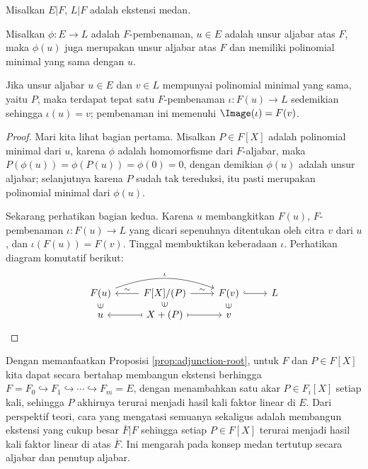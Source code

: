 \begin{proposition}\label{prop:field-embedding}
	Misalkan $E|F$, $L|F$ adalah ekstensi medan.
	\begin{compactenum}[(i)]
		\item Misalkan $\phi: E \to L$ adalah $F$-pembenaman, $u \in E$ adalah unsur aljabar atas $F$, maka $\phi(u)$ juga merupakan unsur aljabar atas $F$ dan memiliki polinomial minimal yang sama dengan $u$.
		\item Jika unsur aljabar $u \in E$ dan $v \in L$ mempunyai polinomial minimal yang sama, yaitu $P$, maka terdapat tepat satu $F$-pembenaman $\iota: F(u) \to L$ sedemikian sehingga $\iota(u)=v$; pembenaman ini memenuhi $\Image(\iota)=F(v)$.
	\end{compactenum}
\end{proposition}
\begin{proof}
	Mari kita lihat bagian pertama. Misalkan $P \in F[X]$ adalah polinomial minimal dari $u$, karena $\phi$ adalah homomorfisme dari $F$-aljabar, maka $P(\phi(u)) = \phi(P(u)) = \phi(0) =0$, dengan demikian $\phi(u)$ adalah unsur aljabar; selanjutnya karena $P$ sudah tak tereduksi, itu pasti merupakan polinomial minimal dari $\phi(u)$.

	Sekarang perhatikan bagian kedua. Karena $u$ membangkitkan $F(u)$, $F$-pembenaman $\iota: F(u) \to L$ yang dicari sepenuhnya ditentukan oleh citra $v$ dari $u$, dan $\iota(F(u))=F(v)$. Tinggal membuktikan keberadaan $\iota$. Perhatikan diagram komutatif berikut:
	\begin{equation*}\begin{tikzcd}[row sep=tiny]
		F(u) \arrow[bend left=20, rr, "\iota"] & F[X]/(P) \arrow[l, "\sim"'] \arrow[r, "\sim"] & F(v) \arrow[hookrightarrow, r] & L \\
		u \arrow[phantom, u, sloped, "\in" description] & X+(P) \arrow[mapsto, l] \arrow[mapsto, r] \arrow[phantom, u, sloped, "\in" description] & v \arrow[phantom, u, sloped, "\in" description] &
	\end{tikzcd}\end{equation*}
\end{proof}

Dengan memanfaatkan Proposisi \ref{prop:adjunction-root}, untuk $F$ dan $P \in F[X]$ kita dapat secara bertahap membangun ekstensi berhingga $F = F_0 \hookrightarrow F_1 \hookrightarrow \cdots \hookrightarrow F_m = E$, dengan menambahkan satu akar $P \in F_i[X]$ setiap kali, sehingga $P$ akhirnya terurai menjadi hasil kali faktor linear di $E$. Dari perspektif teori, cara yang mengatasi semuanya sekaligus adalah membangun ekstensi yang cukup besar $\overline{F}|F$ sehingga setiap $P \in F[X]$ terurai menjadi hasil kali faktor linear di atas $\overline{F}$. Ini mengarah pada konsep medan tertutup secara aljabar dan penutup aljabar.

